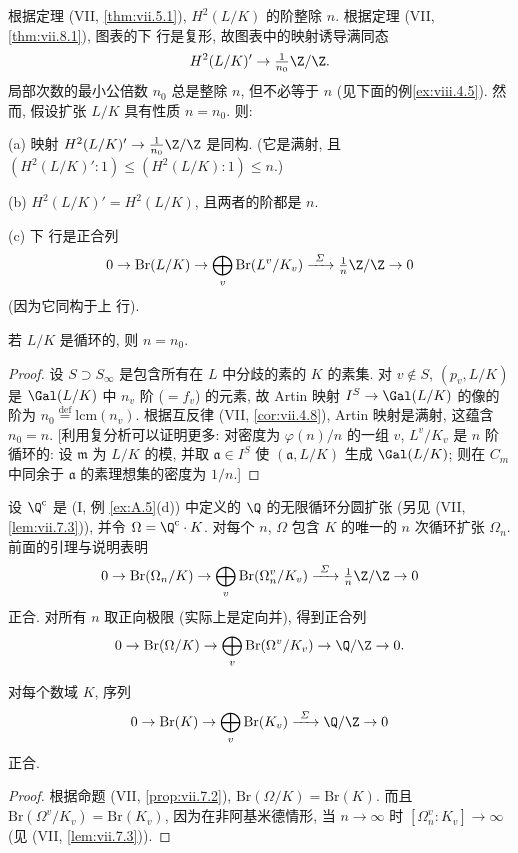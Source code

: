 根据定理 (VII, \ref{thm:vii.5.1}), $H^{2}(L/K)$ 的阶整除 $n$. 根据定理 (VII, \ref{thm:vii.8.1}), 图表的下 行是复形, 故图表中的映射诱导满同态
\[
H^{2}(L/K)^{\prime}\to\tfrac{1}{n_{0}}\Z/\Z.
\]
局部次数的最小公倍数 $n_0$ 总是整除 $n$, 但不必等于 $n$ (见下面的例\ref{ex:viii.4.5}). 然而, 假设扩张 $L/K$ 具有性质 $n=n_0$. 则:

(a) 映射 $H^{2}(L/K)'\to\frac{1}{n_0}\Z/\Z$ 是同构. (它是满射, 且 $(H^{2}(L/K)':1)\le(H^{2}(L/K):1)\le n$.)

(b) $H^{2}(L/K)'=H^{2}(L/K)$, 且两者的阶都是 $n$.

(c) 下 行是正合列
\[
0\to\mathrm{Br}(L/K)\to\bigoplus_{v}\mathrm{Br}(L^{v}/K_{v})\xrightarrow{\ \varSigma\ }\tfrac{1}{n}\Z/\Z\to0
\]
(因为它同构于上 行).

\begin{lemma}\label{lem:viii.4.1}
若 $L/K$ 是循环的, 则 $n=n_0$.
\end{lemma}

\begin{proof}
设 $S\supset S_\infty$ 是包含所有在 $L$ 中分歧的素的 $K$ 的素集. 对 $v\notin S$, $(p_v,L/K)$ 是 $\Gal(L/K)$ 中 $n_v$ 阶 ($=f_v$) 的元素, 故 Artin 映射 $I^{S}\to\Gal(L/K)$ 的像的阶为 $n_0\overset{\text{def}}{=}\mathrm{lcm}(n_v)$. 根据互反律 (VII, \ref{cor:vii.4.8}), Artin 映射是满射, 这蕴含 $n_0=n$. [利用复分析可以证明更多: 对密度为 $\varphi(n)/n$ 的一组 $v$, $L^{v}/K_v$ 是 $n$ 阶循环的: 设 $\mathfrak{m}$ 为 $L/K$ 的模, 并取 $\mathfrak{a}\in I^{S}$ 使 $(\mathfrak{a},L/K)$ 生成 $\Gal(L/K)$; 则在 $C_m$ 中同余于 $\mathfrak{a}$ 的素理想集的密度为 $1/n$.]
\end{proof}

设 $\Q^{\mathrm{c}}$ 是 (I, 例 \ref{ex:A.5}(d)) 中定义的 $\Q$ 的无限循环分圆扩张 (另见 (VII, \ref{lem:vii.7.3})), 并令 $\Omega=\Q^{\mathrm{c}}\cdot K$. 对每个 $n$, $\Omega$ 包含 $K$ 的唯一的 $n$ 次循环扩张 $\Omega_n$. 前面的引理与说明表明
\[
0\to\mathrm{Br}(\Omega_{n}/K)\to\bigoplus_{v}\mathrm{Br}(\Omega_{n}^{v}/K_{v})\xrightarrow{\ \varSigma\ }\tfrac{1}{n}\Z/\Z\to0
\]
正合. 对所有 $n$ 取正向极限 (实际上是定向并), 得到正合列
\[
0\to\mathrm{Br}(\Omega/K)\to\bigoplus_{v}\mathrm{Br}(\Omega^{v}/K_{v})\to\Q/\Z\to0.
\]

\begin{theorem}\label{thm:viii.4.2}
对每个数域 $K$, 序列
\[
0\to\mathrm{Br}(K)\to\bigoplus_{v}\mathrm{Br}(K_{v})\xrightarrow{\ \varSigma\ }\Q/\Z\to0
\]
正合.
\end{theorem}

\begin{proof}
根据命题 (VII, \ref{prop:vii.7.2}), $\mathrm{Br}(\Omega/K)=\mathrm{Br}(K)$. 而且 $\mathrm{Br}(\Omega^{v}/K_v)=\mathrm{Br}(K_v)$, 因为在非阿基米德情形, 当 $n\to\infty$ 时 $[\Omega_n^{v}:K_v]\to\infty$ (见 (VII, \ref{lem:vii.7.3})).
\end{proof}

